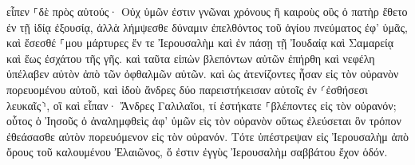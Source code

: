 \documentclass{openreader}
\begin{document}
εἶπεν ⸀δὲ πρὸς αὐτούς· Οὐχ ὑμῶν ἐστιν γνῶναι χρόνους ἢ καιροὺς οὓς ὁ πατὴρ ἔθετο ἐν τῇ ἰδίᾳ ἐξουσίᾳ, 
ἀλλὰ λήμψεσθε δύναμιν ἐπελθόντος τοῦ ἁγίου πνεύματος ἐφ’ ὑμᾶς, καὶ ἔσεσθέ ⸀μου μάρτυρες ἔν τε Ἰερουσαλὴμ καὶ ἐν πάσῃ τῇ Ἰουδαίᾳ καὶ Σαμαρείᾳ καὶ ἕως ἐσχάτου τῆς γῆς. 
καὶ ταῦτα εἰπὼν βλεπόντων αὐτῶν ἐπήρθη καὶ νεφέλη ὑπέλαβεν αὐτὸν ἀπὸ τῶν ὀφθαλμῶν αὐτῶν. 
καὶ ὡς ἀτενίζοντες ἦσαν εἰς τὸν οὐρανὸν πορευομένου αὐτοῦ, καὶ ἰδοὺ ἄνδρες δύο παρειστήκεισαν αὐτοῖς ἐν ⸂ἐσθήσεσι λευκαῖς⸃, 
οἳ καὶ εἶπαν· Ἄνδρες Γαλιλαῖοι, τί ἑστήκατε ⸀βλέποντες εἰς τὸν οὐρανόν; οὗτος ὁ Ἰησοῦς ὁ ἀναλημφθεὶς ἀφ’ ὑμῶν εἰς τὸν οὐρανὸν οὕτως ἐλεύσεται ὃν τρόπον ἐθεάσασθε αὐτὸν πορευόμενον εἰς τὸν οὐρανόν. 
Τότε ὑπέστρεψαν εἰς Ἰερουσαλὴμ ἀπὸ ὄρους τοῦ καλουμένου Ἐλαιῶνος, ὅ ἐστιν ἐγγὺς Ἰερουσαλὴμ σαββάτου ἔχον ὁδόν. 
\end{document}
